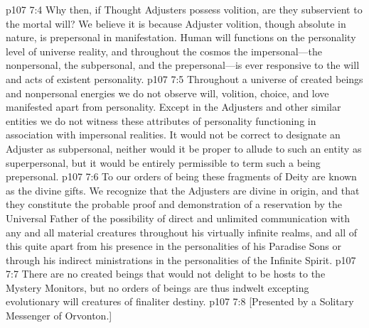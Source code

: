 \vs p107 7:4 Why then, if Thought Adjusters possess volition, are they subservient to the mortal will? We believe it is because Adjuster volition, though absolute in nature, is prepersonal in manifestation. Human will functions on the personality level of universe reality, and throughout the cosmos the impersonal---the nonpersonal, the subpersonal, and the prepersonal---is ever responsive to the will and acts of existent personality.
\vs p107 7:5 Throughout a universe of created beings and nonpersonal energies we do not observe will, volition, choice, and love manifested apart from personality. Except in the Adjusters and other similar entities we do not witness these attributes of personality functioning in association with impersonal realities. It would not be correct to designate an Adjuster as subpersonal, neither would it be proper to allude to such an entity as superpersonal, but it would be entirely permissible to term such a being prepersonal.
\pc \vs p107 7:6 To our orders of being these fragments of Deity are known as the divine gifts. We recognize that the Adjusters are divine in origin, and that they constitute the probable proof and demonstration of a reservation by the Universal Father of the possibility of direct and unlimited communication with any and all material creatures throughout his virtually infinite realms, and all of this quite apart from his presence in the personalities of his Paradise Sons or through his indirect ministrations in the personalities of the Infinite Spirit.
\vs p107 7:7 There are no created beings that would not delight to be hosts to the Mystery Monitors, but no orders of beings are thus indwelt excepting evolutionary will creatures of finaliter destiny.
\vsetoff
\vs p107 7:8 [Presented by a Solitary Messenger of Orvonton.]
